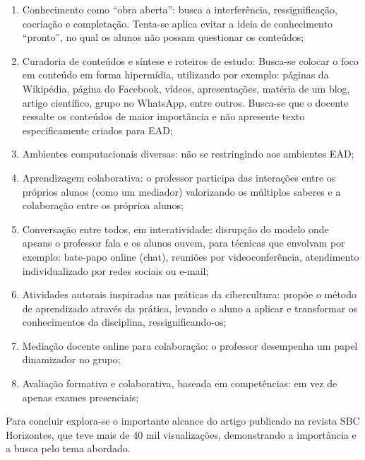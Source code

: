 \begin{enumerate}
  \item Conhecimento como ``obra aberta'': busca a interferência, ressignificação, cocriação e completação. Tenta-se aplica evitar a ideia de conhecimento ``pronto'', no qual os alunos não possam questionar os conteúdos;
  \item Curadoria de conteúdos e síntese e roteiros de estudo: Busca-se colocar o foco em conteúdo em forma hipermídia, utilizando por exemplo: páginas da Wikipédia, página do Facebook, vídeos, apresentações, matéria de um blog, artigo científico, grupo no WhatsApp, entre outros. Busca-se que o docente ressalte os conteúdos de maior importância e não apresente texto especificamente criados para EAD;
  \item Ambientes computacionais diversas: não se restringindo aos ambientes EAD;
  \item Aprendizagem colaborativa: o professor participa das interações entre os próprios alunos (como um mediador) valorizando os múltiplos saberes e a colaboração entre os próprioa alunos;
  \item Conversação entre todos, em interatividade: disrupção do modelo onde apeans o professor fala e os alunos ouvem, para técnicas que envolvam por exemplo: bate-papo online (chat), reuniões por videoconferência, atendimento individualizado por redes sociais ou e-mail;
  \item Atividades autorais inspiradas nas práticas da cibercultura: propõe o método de aprendizado através da prática, levando o aluno a aplicar e transformar os conhecimentos da disciplina, ressignificando-os;
  \item Mediação docente online para colaboração: o professor desempenha um papel dinamizador no grupo;
  \item Avaliação formativa e colaborativa, baseada em competências: em vez de apenas exames presenciais;
\end{enumerate}

Para concluir explora-se o importante alcance do artigo publicado na revista SBC Horizontes, que teve mais de 40 mil visualizações, demonstrando a importância e a busca pelo tema abordado.

